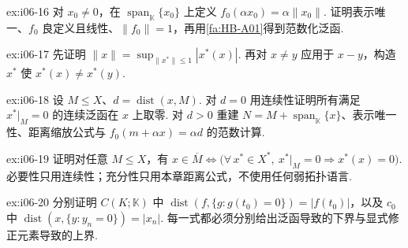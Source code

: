 \begin{FAExercise}[范数化泛函]{ex:i06-16}
对 \(\displaystyle x_0\neq0\)，在 \(\displaystyle \operatorname{span}_{\mathbb K}\{x_0\}\) 上定义 \(\displaystyle f_0(\alpha x_0)=\alpha\|x_0\|\). 证明表示唯一、\(\displaystyle f_0\) 良定义且线性、\(\displaystyle \|f_0\|=1\)，再用\autoref{fa:HB-A01}得到范数化泛函.
\end{FAExercise}

\begin{FAExercise}[对偶范数表示与分离点]{ex:i06-17}
先证明 \(\displaystyle \|x\|=\sup_{\|x^*\|\leqslant1}|x^*(x)|\). 再对 \(\displaystyle x\neq y\) 应用于 \(\displaystyle x-y\)，构造 \(\displaystyle x^*\) 使 \(\displaystyle x^*(x)\neq x^*(y)\).
\end{FAExercise}

\begin{FAExercise}[距离公式的两种情形]{ex:i06-18}
设 \(\displaystyle M\leqslant X\)、\(\displaystyle d=\operatorname{dist}(x,M)\). 对 \(\displaystyle d=0\) 用连续性证明所有满足 \(\displaystyle x^*|_M=0\) 的连续泛函在 \(\displaystyle x\) 上取零. 对 \(\displaystyle d>0\) 重建 \(\displaystyle N=M+\operatorname{span}_{\mathbb K}\{x\}\)、表示唯一性、距离缩放公式与 \(\displaystyle f_0(m+\alpha x)=\alpha d\) 的范数计算.
\end{FAExercise}

\begin{FAExercise}[闭包的连续泛函刻画]{ex:i06-19}
证明对任意 \(\displaystyle M\leqslant X\)，有 \(\displaystyle x\in\overline M \iff \bigl(\forall\,x^*\in X^*,\ x^*|_M=0\Longrightarrow x^*(x)=0\bigr)\).
必要性只用连续性；充分性只用本章距离公式，不使用任何弱拓扑语言.
\end{FAExercise}

\begin{FAExercise}{ex:i06-20}
分别证明 \(\displaystyle C(K;\mathbb K)\) 中 \(\displaystyle \operatorname{dist}(f,\{g:g(t_0)=0\})=|f(t_0)|\)，以及 \(\displaystyle c_0\) 中 \(\displaystyle \operatorname{dist}(x,\{y:y_n=0\})=|x_n|\). 每一式都必须分别给出泛函导致的下界与显式修正元素导致的上界.
\end{FAExercise}
